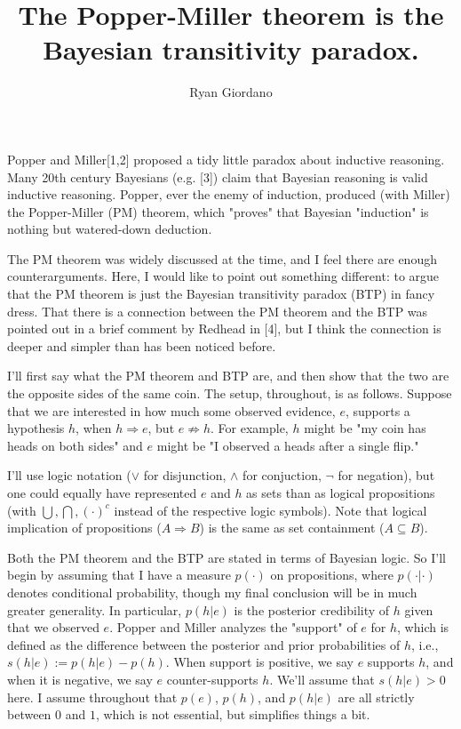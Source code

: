 \documentclass[twoside,11pt]{article}
\numberwithin{equation}{section}
\begin{document}
\title{The Popper-Miller theorem is the Bayesian transitivity paradox.}

\author{Ryan Giordano}

\maketitle


Popper and Miller[1,2] proposed a tidy little paradox about inductive reasoning.
Many 20th century Bayesians (e.g. [3]) claim that Bayesian reasoning is valid
inductive reasoning.  Popper, ever the enemy of induction, produced (with
Miller) the Popper-Miller (PM) theorem, which "proves" that Bayesian
"induction" is nothing but watered-down deduction.

The PM theorem was widely discussed at the time, and I feel there are enough
counterarguments.  Here, I would like to point out something different: to argue
that the PM theorem is just the Bayesian transitivity paradox (BTP) in fancy
dress.  That there is a connection between the PM theorem and the BTP was
pointed out in a brief comment by Redhead in [4], but I think the connection is
deeper and simpler than has been noticed before.

I'll first say what the PM theorem and BTP are, and then show that the two are
the opposite sides of the same coin.  The setup, throughout, is as follows.
Suppose that we are interested in how much some observed evidence, $e$,
supports a hypothesis $h$, when $h \Rightarrow e$, but $e \not\Rightarrow
h$.  For example, $h$ might be "my coin has heads on both sides" and
$e$ might be "I observed a heads after a single flip."

I'll use logic notation ($\lor$ for disjunction, $\land$ for
conjuction, $\lnot$ for negation), but one could equally have represented
$e$ and $h$ as sets than as logical propositions (with $\bigcup, \bigcap,
(\cdot)^c$ instead of the respective logic symbols).  Note that logical
implication of propositions ($A \Rightarrow B$) is the same as set containment
($A \subseteq B$).

Both the PM theorem and the BTP are stated in terms of Bayesian logic. So I'll
begin by assuming that I have a measure $p(\cdot)$ on propositions, where
$p(\cdot | \cdot)$ denotes conditional probability, though my final conclusion
will be in much greater generality.  In particular, $p(h | e)$ is the
posterior credibility of $h$ given that we observed $e$.  Popper and Miller
analyzes the "support" of $e$ for $h$, which is defined as the difference
between the posterior and prior probabilities of $h$, i.e., $s(h | e) := p(h |
e) - p(h)$. When support is positive, we say $e$ supports $h$, and when it
is negative, we say $e$ counter-supports $h$.  We'll assume that $s(h | e) >
0$ here.  I assume throughout that $p(e)$, $p(h)$, and $p(h | e)$ are all
strictly between $0$ and $1$, which is not essential, but simplifies things
a bit.
\end{document}
